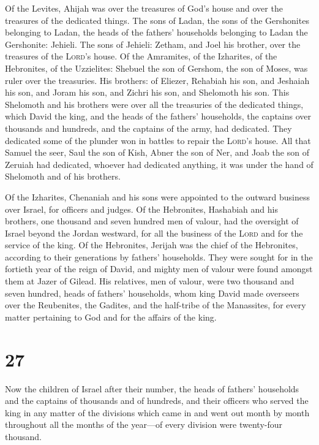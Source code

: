  Of the Levites, Ahijah was over the treasures of God's
house and over the treasures of the dedicated things. 
The sons of Ladan, the sons of the Gershonites belonging to Ladan, the
heads of the fathers' households belonging to Ladan the Gershonite:
Jehieli.  The sons of Jehieli: Zetham, and Joel his
brother, over the treasures of the \textsc{Lord}'s house.
 Of the Amramites, of the Izharites, of the Hebronites,
of the Uzzielites:  Shebuel the son of Gershom, the son
of Moses, was ruler over the treasuries.  His brothers:
of Eliezer, Rehabiah his son, and Jeshaiah his son, and Joram his son,
and Zichri his son, and Shelomoth his son.  This
Shelomoth and his brothers were over all the treasuries of the dedicated
things, which David the king, and the heads of the fathers' households,
the captains over thousands and hundreds, and the captains of the army,
had dedicated.  They dedicated some of the plunder won in
battles to repair the \textsc{Lord}'s house.  All that
Samuel the seer, Saul the son of Kish, Abner the son of Ner, and Joab
the son of Zeruiah had dedicated, whoever had dedicated anything, it was
under the hand of Shelomoth and of his brothers.

 Of the Izharites, Chenaniah and his sons were appointed
to the outward business over Israel, for officers and judges.
 Of the Hebronites, Hashabiah and his brothers, one
thousand and seven hundred men of valour, had the oversight of Israel
beyond the Jordan westward, for all the business of the \textsc{Lord}
and for the service of the king.  Of the Hebronites,
Jerijah was the chief of the Hebronites, according to their generations
by fathers' households. They were sought for in the fortieth year of the
reign of David, and mighty men of valour were found amongst them at
Jazer of Gilead.  His relatives, men of valour, were two
thousand and seven hundred, heads of fathers' households, whom king
David made overseers over the Reubenites, the Gadites, and the
half-tribe of the Manassites, for every matter pertaining to God and for
the affairs of the king.

\hypertarget{section-26}{%
\section{27}\label{section-26}}

 Now the children of Israel after their number, the heads
of fathers' households and the captains of thousands and of hundreds,
and their officers who served the king in any matter of the divisions
which came in and went out month by month throughout all the months of
the year---of every division were twenty-four thousand.

